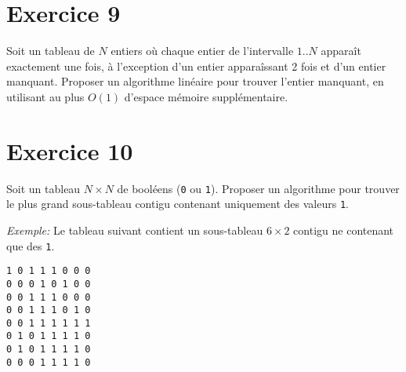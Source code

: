 \documentclass[a4paper,10pt]{article}
\begin{document}
\section*{Exercice 9}

Soit un tableau de $N$ entiers où chaque entier de l'intervalle $1..N$ apparaît exactement une fois, à l'exception d'un entier apparaîssant 2 fois et d'un entier manquant.
Proposer un algorithme linéaire pour trouver l'entier manquant, en utilisant au plus $O(1)$ d'espace mémoire supplémentaire.

\section*{Exercice 10}

Soit un tableau $N \times N$ de booléens (\texttt{0} ou \texttt{1}). Proposer un algorithme pour trouver le plus grand sous-tableau contigu contenant uniquement des valeurs \texttt{1}.

\textit{Exemple:} Le tableau suivant contient un sous-tableau $6 \times 2$ contigu ne contenant que des \texttt{1}.

\begin{verbatim}
1 0 1 1 1 0 0 0
0 0 0 1 0 1 0 0
0 0 1 1 1 0 0 0
0 0 1 1 1 0 1 0
0 0 1 1 1 1 1 1
0 1 0 1 1 1 1 0
0 1 0 1 1 1 1 0
0 0 0 1 1 1 1 0
\end{verbatim}
\end{document}
